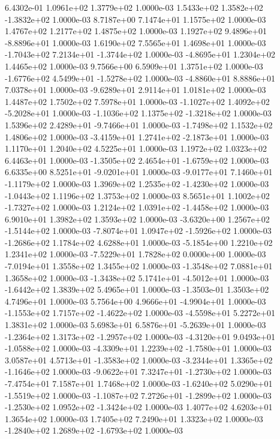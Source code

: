 6.4302e-01 1.0961e+02 1.3779e+02  1.0000e-03
 1.5433e+02  1.3582e+02 -1.3832e+02  1.0000e-03
8.7187e+00 7.1474e+01 1.1575e+02  1.0000e-03
1.4767e+02 1.2177e+02 1.4875e+02  1.0000e-03
 1.1927e+02  9.4896e+01 -8.8896e+01  1.0000e-03
1.6190e+02 7.5565e+01 1.4698e+01  1.0000e-03
-1.7043e+02  7.2134e+01 -1.3744e+02  1.0000e-03
-4.8695e+01  1.2304e+02  1.4465e+02  1.0000e-03
9.7566e+00 6.5909e+01 1.3751e+02  1.0000e-03
-1.6776e+02  4.5499e+01 -1.5278e+02  1.0000e-03
-4.8860e+01  8.8886e+01  7.0378e+01  1.0000e-03
-9.6289e+01  2.9114e+01  1.0181e+02  1.0000e-03
1.4487e+02 1.7502e+02 7.5978e+01  1.0000e-03
-1.1027e+02  1.4092e+02 -5.2028e+01  1.0000e-03
-1.1036e+02  1.1375e+02 -1.3218e+02  1.0000e-03
 1.5396e+02  2.4289e+01 -9.7466e+01  1.0000e-03
-1.7498e+02  1.1532e+02  1.4806e+02  1.0000e-03
-3.4159e+01  1.2741e+02 -2.1873e+01  1.0000e-03
1.1170e+01 1.2040e+02 4.5225e+01  1.0000e-03
1.1972e+02 1.0323e+02 6.4463e+01  1.0000e-03
-1.3505e+02  2.4654e+01 -1.6759e+02  1.0000e-03
 6.6335e+00  8.5251e+01 -9.0201e+01  1.0000e-03
-9.0177e+01  7.1460e+01 -1.1179e+02  1.0000e-03
 1.3969e+02  1.2535e+02 -1.4230e+02  1.0000e-03
-1.0443e+02  1.1196e+02  1.3753e+02  1.0000e-03
 8.5651e+01  1.1002e+02 -1.7327e+02  1.0000e-03
 1.2124e+02  1.0391e+02 -1.4458e+02  1.0000e-03
6.9010e+01 1.3982e+02 1.3593e+02  1.0000e-03
-3.6320e+00  1.2567e+02 -1.5144e+02  1.0000e-03
-7.8074e+01  1.0947e+02 -1.5926e+02  1.0000e-03
-1.2686e+02  1.1784e+02  4.6288e+01  1.0000e-03
-5.1854e+00  1.2210e+02  1.2341e+02  1.0000e-03
-7.5229e+01  1.7828e+02  0.0000e+00  1.0000e-03
-7.0194e+01  1.3558e+02  1.3455e+02  1.0000e-03
-1.3548e+02  7.0881e+01  1.3658e+02  1.0000e-03
-1.3438e+02  5.1741e+01 -4.5012e+01  1.0000e-03
-1.6442e+02  1.3839e+02  5.4965e+01  1.0000e-03
-1.3503e-01  1.3503e+02  4.7496e+01  1.0000e-03
 5.7564e+00  4.9666e+01 -4.9904e+01  1.0000e-03
-1.1553e+02  1.7157e+02 -1.4622e+02  1.0000e-03
-4.5598e+01  5.2272e+01  1.3831e+02  1.0000e-03
 5.6983e+01  6.5876e+01 -5.2639e+01  1.0000e-03
-1.2364e+02  1.3173e+02 -1.2957e+02  1.0000e-03
-4.3120e+01  9.0493e+01 -1.0588e+02  1.0000e-03
-4.3309e+01  1.2239e+02 -1.7580e+01  1.0000e-03
 3.0587e+01  4.5713e+01 -1.3583e+02  1.0000e-03
-3.2344e+01  1.3365e+02 -1.1646e+02  1.0000e-03
-9.0622e+01  7.3247e+01 -1.2730e+02  1.0000e-03
-7.4754e+01  7.1587e+01  1.7468e+02  1.0000e-03
-1.6240e+02  5.0290e+01 -1.5519e+02  1.0000e-03
-1.1087e+02  7.2726e+01 -1.2899e+02  1.0000e-03
-1.2530e+02  1.0952e+02 -1.3424e+02  1.0000e-03
1.4077e+02 4.6203e+01 1.3654e+02  1.0000e-03
1.7405e+02 7.2490e+01 1.3323e+02  1.0000e-03
-1.2840e+02  1.2689e+02 -1.6793e+02  1.0000e-03
